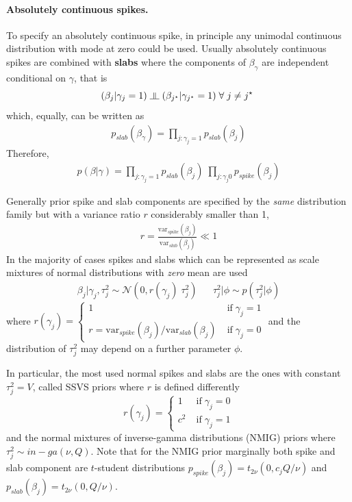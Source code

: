 \documentclass[11 pt]{article}
\begin{document}
\begin{multicols}{2}
\paragraph{Absolutely continuous spikes.} To specify an absolutely continuous spike, in principle any unimodal continuous distribution with mode at zero could be used. Usually absolutely continuous spikes are combined with \textbf{slabs} where the components of $\beta_\gamma$ are independent conditional on $\gamma$, that is $$(\beta_j|\gamma_j = 1) \; \indep \; (\beta_{j^\star}|\gamma_{j^\star}=1) \; \forall \;j \neq j^\star\;$$ which, equally, can be written as
\begin{align*}
    p_{slab}(\beta_\gamma) = \prod_{j:\gamma_j=1}p_{slab}(\beta_j)
\end{align*}
Therefore,
\begin{align*}
    p(\beta|\gamma) = \prod_{j:\gamma_j=1}p_{slab}(\beta_j) \;  \prod_{j: \gamma_j 0}p_{spike}(\beta_j)
\end{align*}

Generally prior spike and slab components are specified by the \textit{same} distribution family but with a variance ratio $r$ considerably smaller than 1,
\begin{align*}
    r = \frac{\text{var}_{spike}(\beta_j)}{\text{var}_{slab}(\beta_j)} \ll 1
\end{align*}
In the majority of cases spikes and slabs which can be represented as scale mixtures of normal distributions with \textit{zero} mean are used
\begin{align*}
    \beta_j|\gamma_j, \tau^2_j \sim \mathcal{N}\left(0, r(\gamma_j)\;\tau^2_j \right) && \tau^2_j|\phi \sim p(\tau^2_j|\phi)
\end{align*}
where $r(\gamma_j)= \begin{cases} 
1 \; &\text{if} \; \gamma_j = 1\\ 
r = \text{var}_{spike}(\beta_j)/\text{var}_{slab}(\beta_j) \; &\text{if} \; \gamma_j = 0\end{cases}$ and the distribution of $\tau^2_j$ may depend on a further parameter $\phi$. 

In particular, the most used normal spikes and slabs are the ones with constant $\tau^2_j = V$, called SSVS priors where
$r$ is defined differently
$$r(\gamma_j)= \begin{cases} 
1 \; &\text{if} \; \gamma_j = 0\\ 
c^2 \; &\text{if} \; \gamma_j = 1\end{cases}$$  and the normal mixtures of inverse-gamma distributions (NMIG) priors where $\tau^2_j \sim in-ga\left(\nu, Q\right)$. Note that for the NMIG prior marginally both spike and slab component are $t$-student distributions $p_{spike}(\beta_j) = t_{2\nu}(0, c_j Q/\nu)$ and $p_{slab}(\beta_j) = t_{2\nu}(0, Q/\nu)$.


\end{multicols}
\end{document}
